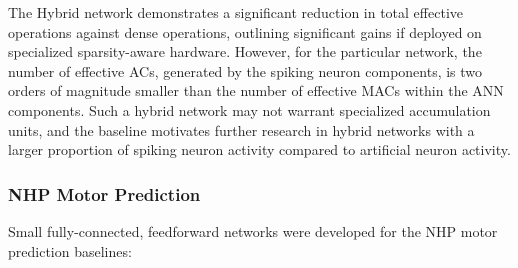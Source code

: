     The Hybrid network demonstrates a significant reduction in total effective operations against dense operations, outlining significant gains if deployed on specialized sparsity-aware hardware. However, for the particular network, the number of effective ACs, generated by the spiking neuron components, is two orders of magnitude smaller than the number of effective MACs within the ANN components. Such a hybrid network may not warrant specialized accumulation units, and the baseline motivates further research in hybrid networks with a larger proportion of spiking neuron activity compared to artificial neuron activity.


    \subsubsection*{NHP Motor Prediction}


    Small fully-connected, feedforward networks were developed for the NHP motor prediction baselines:
    
